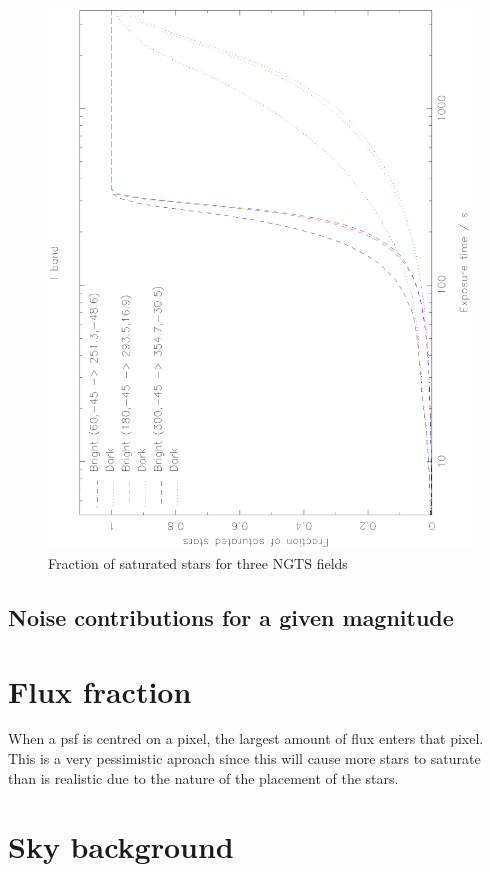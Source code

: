 \documentclass[a4paper]{report}
\begin{document}
\begin{figure}
    \begin{center}
        \includegraphics[angle=270,width=0.9\columnwidth]{images/fractionsaturated}
    \end{center}
    \caption{Fraction of saturated stars for three NGTS fields}
    \label{fig:fractionsaturated}
\end{figure}

\section{Noise contributions for a given magnitude}


\begin{appendices}
\chapter{Flux fraction}
\label{sec:ffraction}

When a psf is centred on a pixel, the largest amount of flux enters that
pixel. This is a very pessimistic aproach since this will cause more
stars to saturate than is realistic due to the nature of the placement
of the stars. 

\chapter{Sky background}




\end{appendices}



\end{document}
